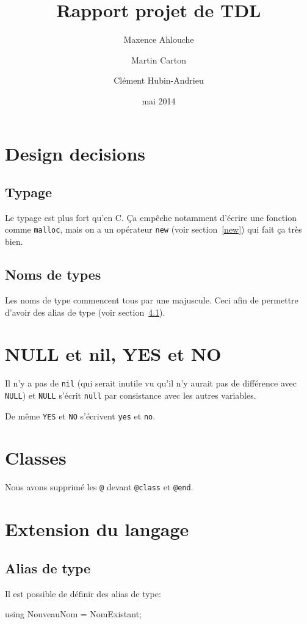 \documentclass{scrartcl}
\title{Rapport projet de TDL}
\author{Maxence Ahlouche \and Martin Carton \and Clément Hubin-Andrieu}
\date{mai 2014}
\begin{document}
  \maketitle
  \tableofcontents
  \newpage

\section{Design decisions}
  \subsection{Typage}
    Le typage est plus fort qu'en C.  Ça empêche notamment d'écrire une
    fonction comme \verb+malloc+, mais on a un opérateur \verb+new+ (voir
    section~\ref{new}) qui fait ça très bien.

  \subsection{Noms de types}
    Les noms de type commencent tous par une majuscule.
    Ceci afin de permettre d'avoir des alias de type (voir
    section~\ref{alias}).

  \section{NULL et nil, YES et NO}
    Il n'y a pas de \verb+nil+ (qui serait inutile vu qu'il n'y aurait pas de
    différence avec \verb+NULL+) et \verb+NULL+ s'écrit \verb+null+ par
    consistance avec les autres variables.

    De même \verb+YES+ et \verb+NO+ s'écrivent \verb+yes+ et \verb+no+.

  \section{Classes}
    Nous avons supprimé les \verb+@+ devant \verb+@class+ et \verb+@end+.

\section{Extension du langage}
  \subsection{Alias de type}\label{alias}
    Il est possible de définir des alias de type:
    \begin{moccode}
using NouveauNom = NomExistant;
    \end{moccode}
\end{document}
